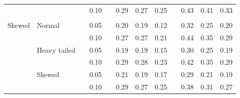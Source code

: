 \documentclass[12pt]{article} %
\begin{document}
\begin{table}[ht]
\begin{scriptsize}
\begin{center}
\begin{tabular}{ll p{.1cm} c p{.1cm} rrr p{.1cm} rrr}
             &              && 0.10 &&  0.29 & 0.27 & 0.25 && 0.43 & 0.41 & 0.33 \\ 
             &&&&&&&&&&&\\
Skewed       & Normal       && 0.05 &&  0.20 & 0.19 & 0.12 && 0.32 & 0.25 & 0.20 \\ 
             &              && 0.10 &&  0.27 & 0.27 & 0.21 && 0.44 & 0.35 & 0.29 \\ 
             & Heavy tailed && 0.05 &&  0.19 & 0.19 & 0.15 && 0.30 & 0.25 & 0.19 \\ 
             &              && 0.10 &&  0.29 & 0.28 & 0.23 && 0.42 & 0.35 & 0.29 \\ 
             & Skewed       && 0.05 &&  0.21 & 0.19 & 0.17 && 0.29 & 0.21 & 0.19 \\ 
             &              && 0.10 &&  0.29 & 0.27 & 0.25 && 0.38 & 0.31 & 0.27 \\ 


\hline
\end{tabular}
\end{center}
\end{scriptsize}
\end{table}
\end{document}
